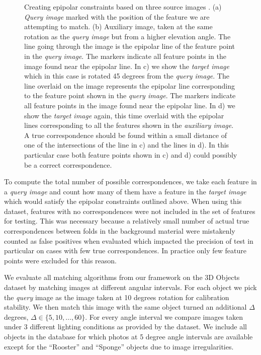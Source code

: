 \documentclass[review]{elsarticle}
\begin{document}
\begin{figure}[htb]
\begin{subfigure}[t]{0.22\columnwidth}
        \label{fig:frog_c_lines}
    \end{subfigure}%
    \caption{Creating epipolar constraints based on three source images \cite{moreels2007evaluation}.  (a) \emph{Query image} marked with the position of the feature we are attempting to match. (b) Auxiliary image, taken at the same rotation as the \emph{query image} but from a higher elevation angle. The line going through the image is the epipolar line of the feature point in the \emph{query image}.  The markers indicate all feature points in the image found near the epipolar line.  In c) we show the \emph{target image} which in this case is rotated 45 degrees from the \emph{query image}.  The line overlaid on the image represents the epipolar line corresponding to the feature point shown in the \emph{query image}.  The markers indicate all feature points in the image found near the epipolar line. In d) we show the \emph{target image} again, this time overlaid with the epipolar lines corresponding to all the features shown in the \emph{auxiliary image}. A true correspondence should be found within a small distance of one of the intersections of the line in c) and the lines in d). In this particular case both feature points shown in c) and d) could possibly be a correct correspondence.
}%
    \label{fig:frog}%
\end{figure}%

To compute the total number of possible correspondences, we take each feature in a \emph{query image} and count how many of them have a feature in the \emph{target image} which would satisfy the epipolar constraints outlined above. When using this dataset, features with no correspondences were not included in the set of features for testing. This was necessary because a relatively small number of actual true correspondences between folds in the background material were mistakenly counted as false positives when evaluated which impacted the precision of test in particular on cases with few true correspondences. In practice only few feature points were excluded for this reason.

We evaluate all matching algorithms from our framework on the 3D Objects dataset by matching images at different angular intervals. For each object we pick the \emph{query} image as the image taken at 10 degrees rotation for calibration stability.  We then match this image with the same object turned an additional $\Delta$ degrees, $\Delta \in \{5, 10, \ldots, 60\}$.  For every angle interval we compare images taken under 3 different lighting conditions as provided by the dataset. We include all objects in the database for which photos at 5 degree angle intervals are available except for the ``Rooster'' and ``Sponge'' objects due to image irregularities. 
\end{document}
